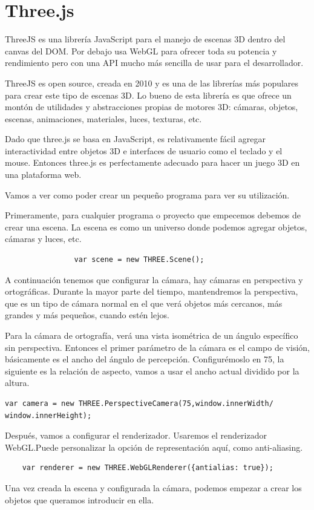 \documentclass[a4paper, 12pt]{book}
\begin{document}
\section{Three.js} 
\label{sec:Three}


ThreeJS es una librería JavaScript para el manejo de escenas 3D dentro del canvas del DOM. Por debajo usa WebGL para ofrecer toda su potencia y rendimiento pero con una API mucho más sencilla de usar para el desarrollador.
\newpage

ThreeJS es open source, creada en 2010 y es una de las librerías más populares para crear este tipo de escenas 3D.
Lo bueno de esta librería es que ofrece un montón de utilidades y abstracciones propias de motores 3D: cámaras, objetos, escenas, animaciones, materiales, luces, texturas, etc.

Dado que three.js se basa en JavaScript, es relativamente fácil agregar interactividad entre objetos 3D e interfaces de usuario como el teclado y el mouse. Entonces three.js es perfectamente adecuado para hacer un juego 3D en una plataforma web.

Vamos a ver como poder crear un pequeño programa para ver su utilización.

Primeramente, para cualquier programa o proyecto que empecemos debemos de crear una escena. La escena es como un universo donde podemos agregar objetos, cámaras y luces, etc.

\begin{verbatim}
                var scene = new THREE.Scene();
\end{verbatim}
A continuación tenemos que configurar la cámara, hay cámaras en perspectiva y ortográficas. Durante la mayor parte del tiempo, mantendremos la perspectiva, que es un tipo de cámara normal en el que verá objetos más cercanos, más grandes y más pequeños, cuando estén lejos.

Para la cámara de ortografía, verá una vista isométrica de un ángulo específico sin perspectiva.
Entonces el primer parámetro de la cámara es el campo de visión, básicamente es el ancho del ángulo de percepción. Configurémoslo en 75, la siguiente es la relación de aspecto, vamos a usar el ancho actual dividido por la altura.

\begin{verbatim}
var camera = new THREE.PerspectiveCamera(75,window.innerWidth/
window.innerHeight);
\end{verbatim}

Después, vamos a configurar el renderizador. Usaremos el renderizador WebGL.Puede personalizar la opción de representación aquí, como anti-aliasing. 
\begin{verbatim}
    var renderer = new THREE.WebGLRenderer({antialias: true});
\end{verbatim}
Una vez creada la escena y configurada la cámara, podemos empezar a crear los objetos que queramos introducir en ella. 
\end{document}
